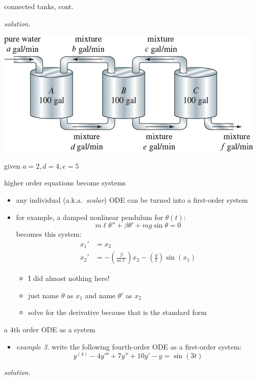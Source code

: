 \documentclass[urlcolor=blue,dvipsnames]{beamer}
\begin{document}
\begin{frame}{connected tanks, cont.}

\noindent \emph{solution.}

\vspace{45mm}

\hfill \begin{minipage}{0.55\textwidth}
\includegraphics[width=\textwidth]{figs/three-tanks}

\scriptsize
\hfill given $a=2,d=4,e=5$
\end{minipage}
\end{frame}


\begin{frame}{higher order equations become systems}

\begin{itemize}
\item \alert{any} individual (a.k.a.~\emph{scalar}) ODE can be turned into a first-order system
\item for example, a damped nonlinear pendulum for $\theta(t)$:
    $$m \ell \theta'' + \beta \theta' + mg \sin\theta = 0$$
becomes this system:
\begin{align*}
x_1' &= x_2 \\
x_2' &= -\left(\frac{\beta}{m\ell}\right) x_2 - \left(\frac{g}{\ell}\right) \sin(x_1)
\end{align*}
    \begin{itemize}
    \item \alert{I did almost nothing here!}
    \item just name $\theta$ as $x_1$ and name $\theta'$ as $x_2$
    \item \small solve for the derivative because that is the standard form
    \end{itemize}
\end{itemize}
\end{frame}


\begin{frame}{a 4th order ODE as a system}

\begin{itemize}
\item \emph{example 3.}  write the following fourth-order ODE as a first-order system:
    $$y^{(4)} - 4 y''' + 7 y'' + 10 y' - y = \sin(3t)$$
\end{itemize}

\noindent \emph{solution.}

\vspace{45mm}
\end{frame}
\end{document}
